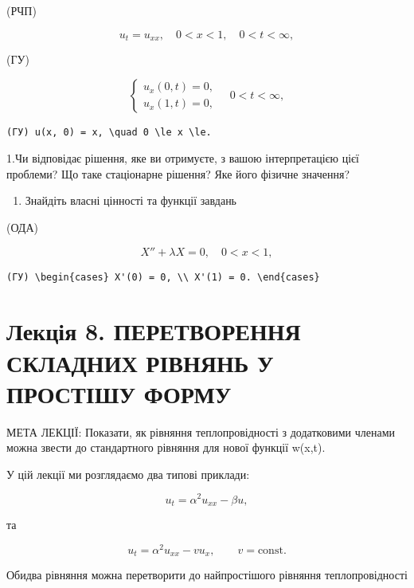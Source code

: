 \documentclass[
  ukrainian,
]{article}
\providecommand{\tightlist}{%
  \setlength{\itemsep}{0pt}\setlength{\parskip}{0pt}}
\begin{document}
(РЧП)

\[
u_t = u_{xx}, \quad 0 < x < 1, \quad 0 < t < \infty,
\]

(ГУ)

\[
\begin{cases} u_x (0, t) = 0, \\ u_x (1, t) = 0, \end{cases} \quad 0 < t < \infty,
\]

\begin{verbatim}
(ГУ) u(x, 0) = x, \quad 0 \le x \le.
\end{verbatim}

1.Чи відповідає рішення, яке ви отримуєте, з вашою інтерпретацією цієї
проблеми? Що таке стаціонарне рішення? Яке його фізичне значення?

\begin{enumerate}
\def\labelenumi{\arabic{enumi}.}
\setcounter{enumi}{3}
\tightlist
\item
  Знайдіть власні цінності та функції завдань
\end{enumerate}

(ОДА)

\[
X'' + \lambda X = 0, \quad 0 < x < 1,
\]

\begin{verbatim}
(ГУ) \begin{cases} X'(0) = 0, \\ X'(1) = 0. \end{cases}
\end{verbatim}

\section{Лекція 8. ПЕРЕТВОРЕННЯ СКЛАДНИХ РІВНЯНЬ У ПРОСТІШУ
ФОРМУ}\label{ux43bux435ux43aux446ux456ux44f-8.-ux43fux435ux440ux435ux442ux432ux43eux440ux435ux43dux43dux44f-ux441ux43aux43bux430ux434ux43dux438ux445-ux440ux456ux432ux43dux44fux43dux44c-ux443-ux43fux440ux43eux441ux442ux456ux448ux443-ux444ux43eux440ux43cux443}

МЕТА ЛЕКЦІЇ: Показати, як рівняння теплопровідності з додатковими
членами можна звести до стандартного рівняння для нової функції w(x,t).

У цій лекції ми розглядаємо два типові приклади:

\[
u_t = \alpha^2 u_{xx} - \beta u,
\]

та

\[
u_t = \alpha^2 u_{xx} - v u_x, \qquad v=\text{const}.
\]

Обидва рівняння можна перетворити до найпростішого рівняння
теплопровідності
\end{document}
